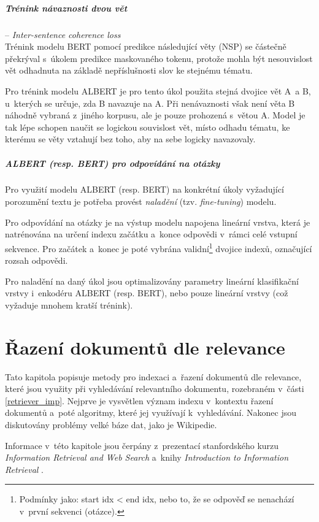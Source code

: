 \paragraph{Trénink návaznosti dvou vět} -- \textit{Inter-sentence coherence loss}\\
Trénink modelu BERT pomocí predikce následující věty (NSP) se částečně překrýval s~úkolem predikce maskovaného tokenu, protože mohla být nesouvislost vět odhadnuta na základě nepříslušnosti slov ke stejnému tématu.\par
Pro trénink modelu ALBERT je pro tento úkol použita stejná dvojice vět A~a B, u~kterých se určuje, zda B navazuje na A. Při nenávaznosti však není věta B náhodně vybraná z~jiného korpusu, ale je pouze prohozená s~větou A. Model je tak lépe schopen naučit se logickou souvislost vět, místo odhadu tématu, ke kterému se věty vztahují bez toho, aby na sebe logicky navazovaly.
\bigskip\bigskip
\paragraph{ALBERT (resp. BERT) pro odpovídání na otázky}
Pro využití modelu ALBERT (resp. BERT) na konkrétní úkoly vyžadující porozumění textu je potřeba provést \emph{naladění} (tzv. \emph{fine-tuning}) modelu.\par
Pro odpovídání na otázky je na výstup modelu napojena lineární vrstva, která je natrénována na určení indexu začátku a~konce odpovědi v~rámci celé vstupní sekvence. Pro začátek a~konec je poté vybrána validní\footnote{Podmínky jako: start idx < end idx, nebo to, že se odpověď se nenachází v~první sekvenci (otázce).} dvojice indexů, označující rozsah odpovědi.\par
Pro naladění na daný úkol jsou optimalizovány parametry lineární klasifikační vrstvy i~enkodéru ALBERT (resp. BERT), nebo pouze lineární vrstvy (což vyžaduje mnohem kratší trénink).\pagebreak


\chapter{Řazení dokumentů dle relevance}
\label{document_indexing}
Tato kapitola popisuje metody pro indexaci a~řazení dokumentů dle relevance, které jsou využity při vyhledávání relevantního dokumentu, rozebraném v~části \ref{retriever_imp}. Nejprve je vysvětlen význam indexu v~kontextu řazení dokumentů a~poté algoritmy, které jej využívají k~vyhledávání. Nakonec jsou diskutovány problémy velké báze dat, jako je Wikipedie.\par
Informace v~této kapitole jsou čerpány z~prezentací stanfordského kurzu \emph{Information Retrieval and Web Search} \cite{stanford:retrieval} a~knihy \emph{Introduction to Information Retrieval} \cite{information_retrieval}.

